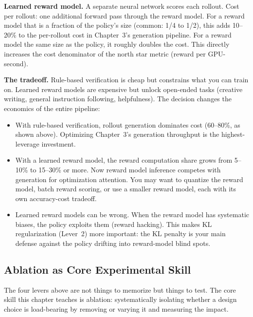 \textbf{Learned reward model.} A separate neural network scores each rollout. Cost per rollout: one additional forward pass through the reward model. For a reward model that is a fraction of the policy's size (common: 1/4 to 1/2), this adds 10--20\% to the per-rollout cost in Chapter~3's generation pipeline. For a reward model the same size as the policy, it roughly doubles the cost. This directly increases the cost denominator of the north star metric (reward per GPU-second).

\textbf{The tradeoff.} Rule-based verification is cheap but constrains what you can train on. Learned reward models are expensive but unlock open-ended tasks (creative writing, general instruction following, helpfulness). The decision changes the economics of the entire pipeline:

\begin{itemize}
  \item With rule-based verification, rollout generation dominates cost (60--80\%, as shown above). Optimizing Chapter~3's generation throughput is the highest-leverage investment.
  \item With a learned reward model, the reward computation share grows from 5--10\% to 15--30\% or more. Now reward model inference competes with generation for optimization attention. You may want to quantize the reward model, batch reward scoring, or use a smaller reward model, each with its own accuracy-cost tradeoff.
  \item Learned reward models can be wrong. When the reward model has systematic biases, the policy exploits them (reward hacking). This makes KL regularization (Lever~2) more important: the KL penalty is your main defense against the policy drifting into reward-model blind spots.
\end{itemize}

\subsection*{Ablation as Core Experimental Skill}

The four levers above are not things to memorize but things to test. The core skill this chapter teaches is ablation: systematically isolating whether a design choice is load-bearing by removing or varying it and measuring the impact.

